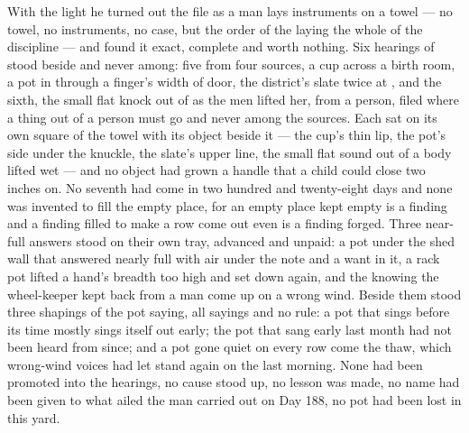 With the light he turned out the file as a man lays instruments on a towel --- no towel, no instruments, no case, but the order of the laying the whole of the discipline --- and found it exact, complete and worth nothing. Six hearings of  stood beside and never among: five from four sources, a cup across a birth room, a pot in  through a finger's width of door, the district's slate twice at , and the sixth, the small flat knock out of  as the men lifted her, from a person, filed where a thing out of a person must go and never among the sources. Each sat on its own square of the towel with its object beside it --- the cup's thin lip, the pot's side under the knuckle, the slate's upper line, the small flat sound out of a body lifted wet --- and no object had grown a handle that a child could close two inches on. No seventh had come in two hundred and twenty-eight days and none was invented to fill the empty place, for an empty place kept empty is a finding and a finding filled to make a row come out even is a finding forged. Three near-full answers stood on their own tray, advanced and unpaid: a pot under the shed wall that answered nearly full with air under the note and a want in it, a rack pot lifted a hand's breadth too high and set down again, and the knowing the wheel-keeper kept back from a man come up on a wrong wind. Beside them stood three shapings of the pot saying, all sayings and no rule: a pot that sings before its time mostly sings itself out early; the pot that sang early last month had not been heard from since; and a pot gone quiet on every row come the thaw, which wrong-wind voices had let stand again on the last morning. None had been promoted into the hearings, no cause stood up, no lesson was made, no name had been given to what ailed the man carried out on Day 188, no pot had been lost in this yard.

